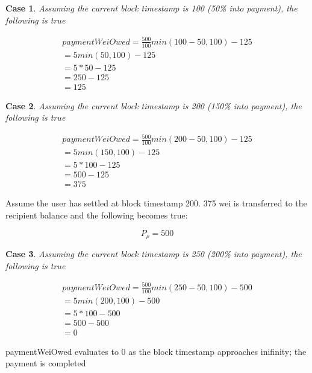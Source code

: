 \documentclass[12pt]{article}
\newtheorem{case}{Case}
\begin{document}
\begin{case}

Assuming the current block timestamp is 100 (50\% into payment), the following is true

\end{case}

\begin{align*}
    paymentWeiOwed = \frac{500}{100}min(100 - 50, 100) - 125 \\
                   = 5min(50, 100) - 125 \\
                   = 5 * 50 - 125 \\
                   = 250 - 125 \\
                   = 125
\end{align*}

\begin{case}

Assuming the current block timestamp is 200 (150\% into payment), the following is true

\end{case}

\begin{align*}
    paymentWeiOwed = \frac{500}{100}min(200 - 50, 100) - 125 \\
                   = 5min(150, 100) - 125 \\
                   = 5 * 100 - 125 \\
                   = 500 - 125 \\
                   = 375
\end{align*}


Assume the user has settled at block timestamp 200. 375 wei is transferred to the recipient balance and the following becomes true:

\[
P_\rho = 500
\]

\begin{case}

Assuming the current block timestamp is 250 (200\% into payment), the following is true

\end{case}

\begin{align*}
    paymentWeiOwed = \frac{500}{100}min(250 - 50, 100) - 500 \\
                   = 5min(200, 100) - 500 \\
                   = 5 * 100 - 500 \\
                   = 500 - 500 \\
                   = 0
\end{align*}

paymentWeiOwed evaluates to 0 as the block timestamp approaches inifinity; the payment is completed
\end{document}
